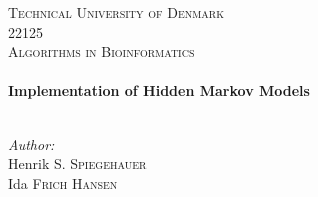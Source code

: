 \begin{titlepage}
\fontsize{10pt}{10pt}
\selectfont
\center %


\textsc{\LARGE Technical University of Denmark}\\[1.3cm] %
\textsc{\large 22125 }\\[0.5cm] %
\textsc{\large Algorithms in Bioinformatics }\\[0.9cm] %


\HRule \\[0.6cm]
{ \large \bfseries\LARGE
Implementation of Hidden Markov Models
} \\[0.8cm]  %
\HRule \\ [2cm]
 
\begin{minipage}{0.6\textwidth}
\begin{flushleft} \large
\emph{Author:}\\
 Henrik \textsc{S. Spiegehauer} \tab{}\\
 Ida \textsc{Frich Hansen} \tab{}\\
\end{flushleft}
\end{minipage}





\end{titlepage}
